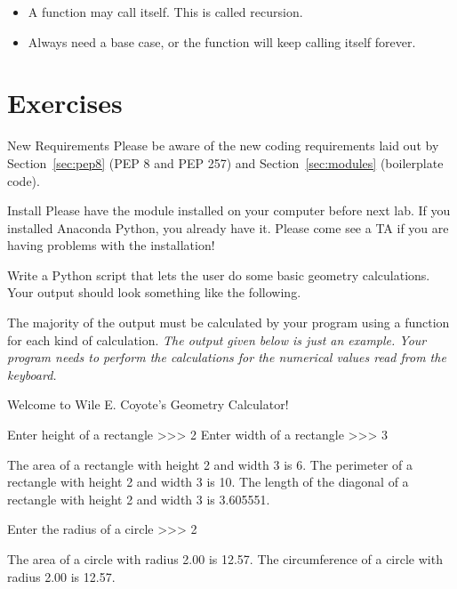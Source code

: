 \documentclass[11pt]{cselabheader}
\begin{document}
{\begin{itemize}
  \item A function may call itself. This is called recursion.
  \item Always need a base case, or the function will keep calling itself
    forever.
\end{itemize}

\pagebreak

\section{Exercises}

\begin{warningbox}{New Requirements}
  Please be aware of the new coding requirements laid out by
  Section~\ref{sec:pep8} (PEP 8 and PEP 257) and Section~\ref{sec:modules}
  (boilerplate code).
\end{warningbox}

\begin{warningbox}{Install}
  Please have the  module installed on your computer
  before next lab. If you installed Anaconda Python, you already have it. Please
  come see a TA if you are having problems with the installation!
\end{warningbox}


\begin{ex}
  Write a Python script that lets the user do some basic
  geometry calculations. Your output should look something like the following.

  The majority of the output must be calculated by your program using a function
  for each kind of calculation. \emph{The output given below is just an example.
  Your program needs to perform the calculations for the numerical values read
  from the keyboard.}

  \begin{verbatimcode}
Welcome to Wile E. Coyote's Geometry Calculator!

Enter height of a rectangle >>> 2
Enter width of a rectangle >>> 3

The area of a rectangle with height 2 and width 3 is 6.
The perimeter of a rectangle with height 2 and width 3 is 10.
The length of the diagonal of a rectangle with height 2 and width 3 is 3.605551.

Enter the radius of a circle >>> 2

The area of a circle with radius 2.00 is 12.57.
The circumference of a circle with radius 2.00 is 12.57.


\end{verbatimcode}
\end{ex}}
\end{document}
